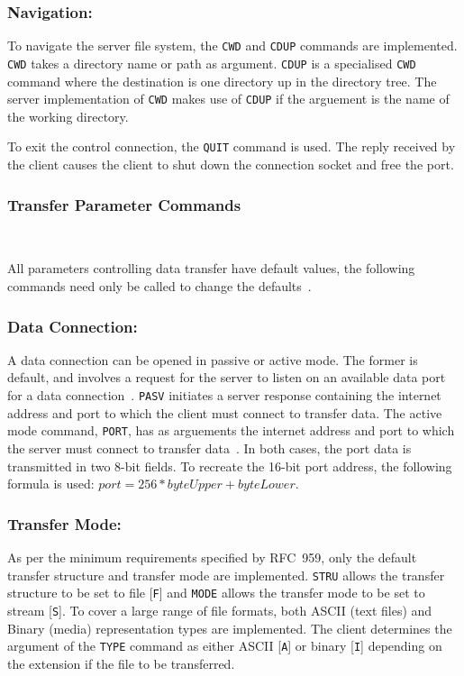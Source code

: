 \documentclass[10pt,twocolumn]{witseiepaper}
\begin{document}
\vspace*{-2mm}
\subsubsection*{Navigation:}
To navigate the server file system, the \texttt{CWD} and \texttt{CDUP} commands are implemented. \texttt{CWD} takes a directory name or path as argument. \texttt{CDUP} is a specialised \texttt{CWD} command where the destination is one directory up in the directory tree. The server implementation of \texttt{CWD} makes use of \texttt{CDUP} if the arguement is the name of the working directory.

To exit the control connection, the \texttt{QUIT} command is used. The reply received by the client causes the client to shut down the connection socket and free the port. 

\vspace*{-2mm}
\subsubsection{Transfer Parameter Commands} $   $

All parameters controlling data transfer have default values, the following commands need only be called to change the defaults~\cite{rfc959}. 

\vspace*{-2mm}
\subsubsection*{Data Connection:} A data connection can be opened in passive or active mode. The former is default, and involves a request for the server to listen on an available data port for a data connection~\cite{rfc959}. \texttt{PASV} initiates a server response containing the internet address and port to which the client must connect to transfer data. The active mode command, \texttt{PORT}, has as arguements the internet address and port to which the server must connect to transfer data~\cite{rfc959}. In both cases, the port data is transmitted in two 8-bit fields. To recreate the 16-bit port address, the following formula is used: $port = 256*byteUpper + byteLower$.

\vspace*{-2mm}
\subsubsection*{Transfer Mode:} 
As per the minimum requirements specified by RFC~959, only the default transfer structure and transfer mode are implemented. \texttt{STRU} allows the transfer structure to be set to file [\texttt{F}] and \texttt{MODE} allows the transfer mode to be set to stream [\texttt{S}]. To cover a large range of file formats, both ASCII (text files) and Binary (media) representation types are implemented. The client determines the argument of the \texttt{TYPE} command as either ASCII [\texttt{A}] or binary [\texttt{I}] depending on the extension if the file to be transferred.
\end{document}
